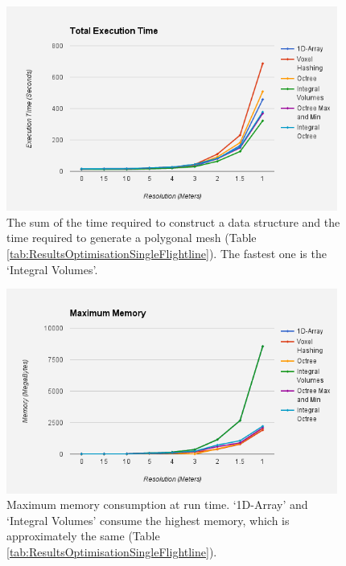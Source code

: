\documentclass{subfiles}
\begin{document}
\begin{figure}[!htbp]
	\centering
	\includegraphics[width=0.97\textwidth]{img/opt/TotalExecutionTime.png}
	\caption[Total Execution Time]{The sum of the time required to construct a data structure and the time required to generate a polygonal mesh (Table \ref{tab:ResultsOptimisationSingleFlightline}). The fastest one is the `Integral Volumes'. }
	\label{fig:TotalTime}
\end{figure}

\begin{figure}[!htbp]
	\centering
	\includegraphics[width=0.97\textwidth]{img/opt/MemoryConsumption}
	\caption[Maximum Memory Consumption] {Maximum memory consumption at run time. `1D-Array' and `Integral Volumes' consume the highest memory, which is approximately the same (Table \ref{tab:ResultsOptimisationSingleFlightline}).}
	\label{fig:MemoryConsumption}
\end{figure}
\end{document}
